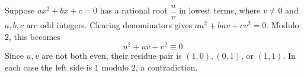 Suppose $ax^2+bx+c=0$ has a rational root $\dfrac{u}{v}$ in lowest terms, where $v\ne0$ and $a,b,c$ are odd integers. Clearing denominators gives $au^2+buv+cv^2=0$. Modulo $2$, this becomes
\[
u^2+uv+v^2\equiv0.
\]
Since $u,v$ are not both even, their residue pair is $(1,0),(0,1)$, or $(1,1)$. In each case the left side is $1$ modulo $2$, a contradiction.
